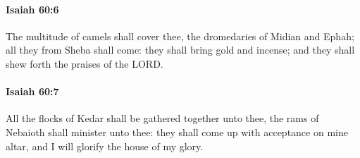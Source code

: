 		\paragraph{Isaiah 60:6} %
			\label{ISAIAH-60-6}

			The multitude of camels shall cover thee, the dromedaries of Midian and Ephah; all they from Sheba shall come: they shall bring gold and incense; and they shall shew forth the praises of the LORD.


		\paragraph{Isaiah 60:7} %
			\label{ISAIAH-60-7}

			All the flocks of Kedar shall be gathered together unto thee, the rams of Nebaioth shall minister unto thee: they shall come up with acceptance on mine altar, and I will glorify the house of my glory.

